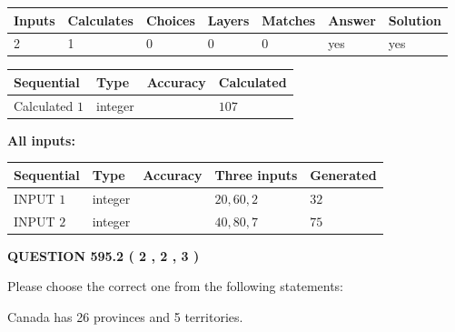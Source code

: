 \documentclass[12pt]{article}
\begin{document}
 

 
   
   
   
   
\noindent\begin{tabular}{|l|l|l|l|l|l|l|}
 \hline
Inputs & Calculates & Choices & Layers & Matches & Answer & Solution \\ \hline
 2  & 
 1  & 
 0
  & 
 0  & 
 0  & 
  yes & 
  yes 
  \\ \hline
 \end{tabular}
   
   
   
   
\noindent{}
   
   
  
  
\noindent\begin{tabular}{|l|l|l|l|}
\hline
 Sequential & Type & Accuracy & Calculated \\ 
\hline
 
 
  Calculated $  1 $ & integer &  & 
  $ 107 $ 
 \\  \hline  
 \end{tabular}
   
   
   
   
\noindent\vspace{0.1in}\hspace{-0.08in} {\textbf{\Large{All inputs: }}}
   
   
  
  
\noindent\begin{tabular}{|l|l|l|l|l|}
\hline
 Sequential & Type & Accuracy & Three inputs & Generated \\ 
\hline
 
 
  INPUT $  1 $ & integer &  & $
 20
 , 
 60
 , 
 2
 $ & $ 32 $ 
 \\  \hline  
 
 
  INPUT $  2 $ & integer &  & $
 40
 , 
 80
 , 
 7
 $ & $ 75 $ 
 \\  \hline  
 \end{tabular}
   
   
  
\vspace{0.2in}
  
{\textbf{\Large{QUESTION
595.2 
 ( 2 , 2 , 3 )
}}}
  
  
Please choose the correct one from the following statements:
 
 
Canada has  26 provinces and  5 territories.
 
\end{document}
